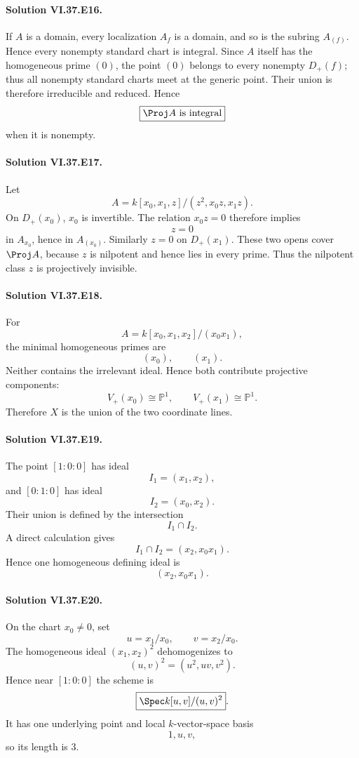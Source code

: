 \paragraph{Solution VI.37.E16.}
If \(A\) is a domain, every localization \(A_f\) is a domain, and so is the subring \(A_{(f)}\). Hence every nonempty standard chart is integral. Since \(A\) itself has the homogeneous prime \((0)\), the point \((0)\) belongs to every nonempty \(D_+(f)\); thus all nonempty standard charts meet at the generic point. Their union is therefore irreducible and reduced. Hence
\[
\boxed{\Proj A\text{ is integral}}
\]
when it is nonempty.

\paragraph{Solution VI.37.E17.}
Let
\[
A=k[x_0,x_1,z]/(z^2,x_0z,x_1z).
\]
On \(D_+(x_0)\), \(x_0\) is invertible. The relation \(x_0z=0\) therefore implies
\[
z=0
\]
in \(A_{x_0}\), hence in \(A_{(x_0)}\). Similarly \(z=0\) on \(D_+(x_1)\). These two opens cover \(\Proj A\), because \(z\) is nilpotent and hence lies in every prime. Thus the nilpotent class \(z\) is projectively invisible.

\paragraph{Solution VI.37.E18.}
For
\[
A=k[x_0,x_1,x_2]/(x_0x_1),
\]
the minimal homogeneous primes are
\[
(x_0),\qquad(x_1).
\]
Neither contains the irrelevant ideal. Hence both contribute projective components:
\[
V_+(x_0)\cong\mathbb P^1,\qquad
V_+(x_1)\cong\mathbb P^1.
\]
Therefore \(X\) is the union of the two coordinate lines.

\paragraph{Solution VI.37.E19.}
The point \([1:0:0]\) has ideal
\[
I_1=(x_1,x_2),
\]
and \([0:1:0]\) has ideal
\[
I_2=(x_0,x_2).
\]
Their union is defined by the intersection
\[
I_1\cap I_2.
\]
A direct calculation gives
\[
I_1\cap I_2=(x_2,x_0x_1).
\]
Hence one homogeneous defining ideal is
\[
\boxed{(x_2,x_0x_1)}.
\]

\paragraph{Solution VI.37.E20.}
On the chart \(x_0\neq0\), set
\[
u=x_1/x_0,\qquad v=x_2/x_0.
\]
The homogeneous ideal \((x_1,x_2)^2\) dehomogenizes to
\[
(u,v)^2=(u^2,uv,v^2).
\]
Hence near \([1:0:0]\) the scheme is
\[
\boxed{\Spec k[u,v]/(u,v)^2}.
\]
It has one underlying point and local \(k\)-vector-space basis
\[
1,u,v,
\]
so its length is \(3\).

